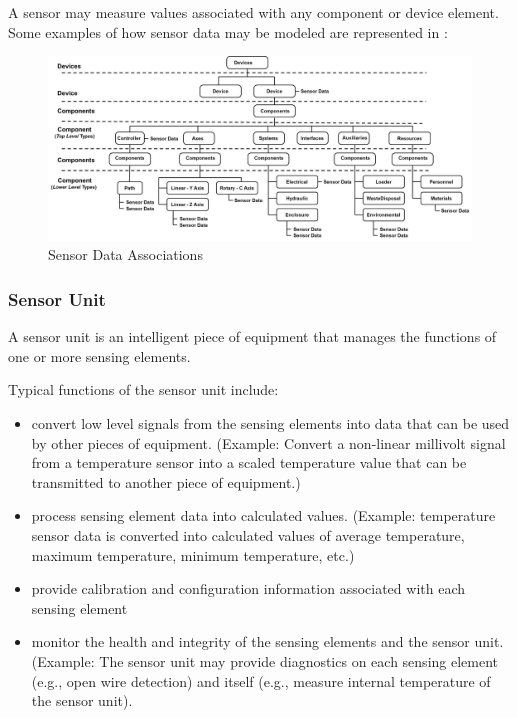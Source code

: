 A sensor may measure values associated with any \gls{component} or \gls{device} element.   Some examples of how sensor data may be modeled are represented in :

\begin{figure}[ht]
  \centering
  \includegraphics[width=.75\textwidth]{figures/sensor-data-associations.png}
  \caption{Sensor Data Associations}
  \label{fig:sensor-data-associations}
\end{figure}

\subsubsection{Sensor Unit}
\label{sec:Sensor Unit}

A \gls{sensor unit} is an intelligent piece of equipment that manages the functions of one or more \glspl{sensing element}.

Typical functions of the \gls{sensor unit} include:

\begin{itemize}
\item convert low level signals from the \glspl{sensing element} into data that can be used by other pieces of equipment.  (Example:  Convert a non-linear millivolt signal from a temperature sensor into a scaled temperature value that can be transmitted to another piece of equipment.)

\item process \gls{sensing element} data into calculated values.  (Example:  temperature sensor data is converted into calculated values of average temperature, maximum temperature, minimum temperature, etc.)

\item provide calibration and configuration information associated with each \gls{sensing element}

\item monitor the health and integrity of the \glspl{sensing element} and the \gls{sensor unit}.  (Example:  The \gls{sensor unit} may provide diagnostics on each \gls{sensing element} (e.g., open wire detection) and itself (e.g., measure internal temperature of the \gls{sensor unit}).
\end{itemize}


